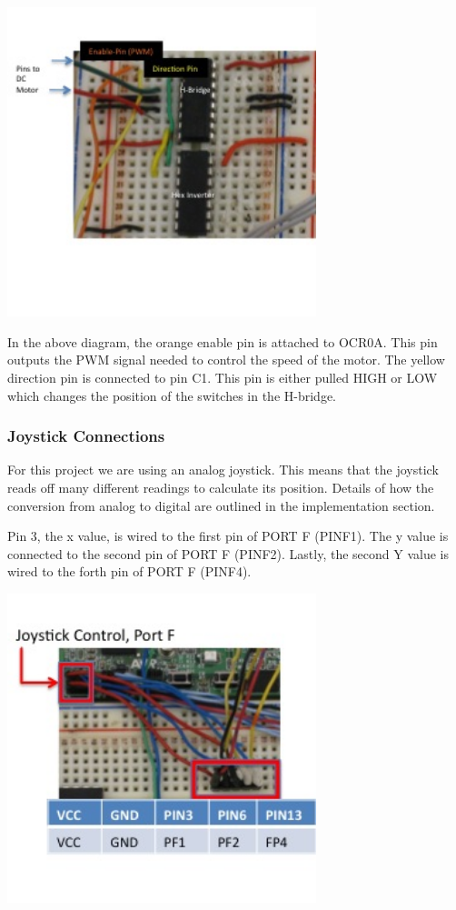   \begin{center}
    \includegraphics[width=90mm]{imageSources/hBridgeConnect2.png}
  \end{center}
  \label{hBridgeConnect2}


In the above diagram, the orange enable pin is attached to OCR0A. This pin outputs the PWM signal needed to control the speed of the motor.  The yellow direction pin is connected to pin C1. This pin is either pulled HIGH or LOW which changes the position of the switches in the H-bridge.

\subsubsection{Joystick Connections}

For this project we are using an analog joystick. This means that  the joystick reads off many different readings to calculate its position. Details of how the conversion from analog to digital are outlined in the implementation section.

Pin 3, the x value, is wired to the first pin of PORT F (PINF1). The y value is connected to the second pin of PORT F (PINF2). Lastly, the second Y value is wired to the forth pin of PORT F (PINF4).

  \begin{center}
    \includegraphics[width=90mm]{imageSources/joystickConnect.png}
  \end{center}
  \label{joystickConnect}


